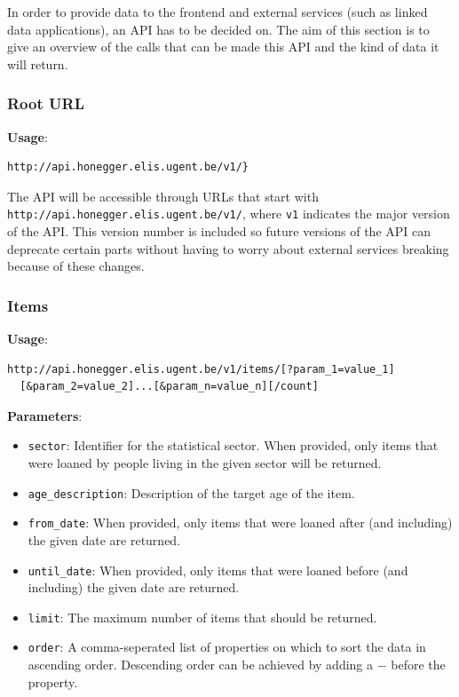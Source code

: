 In order to provide data to the frontend and external services (such as linked data applications), an API has to be decided on. The aim of this section is to give an overview of the calls that can be made this API and the kind of data it will return.

\subsubsection{Root URL}

{\bf Usage}:
\begin{verbatim}
http://api.honegger.elis.ugent.be/v1/}
\end{verbatim}

The API will be accessible through URLs that start with \texttt{http://api.honegger.elis.ugent.be/v1/}, where \texttt{v1} indicates the major version of the API. This version number is included so future versions of the API can deprecate certain parts without having to worry about external services breaking because of these changes.

\subsubsection{Items}

{\bf Usage}:
\begin{verbatim}
http://api.honegger.elis.ugent.be/v1/items/[?param_1=value_1]
  [&param_2=value_2]...[&param_n=value_n][/count]
\end{verbatim}

{\bf Parameters}:
\begin{itemize}
  \item \texttt{sector}: Identifier for the statistical sector. When provided, only items that were loaned by people living in the given sector will be returned.
  \item \texttt{age\_description}: Description of the target age of the item.
  \item \texttt{from\_date}: When provided, only items that were loaned after (and including) the given date are returned.
  \item \texttt{until\_date}: When provided, only items that were loaned before (and including) the given date are returned.
  \item \texttt{limit}: The maximum number of items that should be returned.
  \item \texttt{order}: A comma-seperated list of properties on which to sort the data in ascending order. Descending order can be achieved by adding a $-$ before the property.
\end{itemize}

